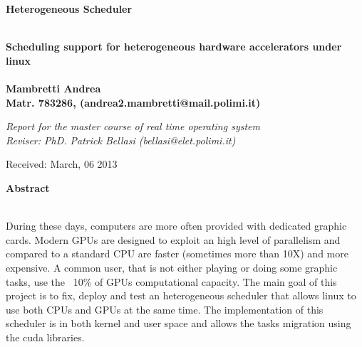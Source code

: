 \documentclass[a4paper,13pt]{article}
\newenvironment*{mytitle}{\begin{LARGE}\bf}{\end{LARGE}\\}%
\newenvironment*{mysubtitle}{\bf}{\\[1.5ex]}%
\newenvironment*{myabstract}{\begin{Large}\bf}{\end{Large}\\[2.5ex]}%
\begin{document}
\begin{mytitle}Heterogeneous Scheduler\end{mytitle}
\begin{mysubtitle}Scheduling support for heterogeneous hardware accelerators under linux\cite{tobias_thesis}\end{mysubtitle}
%
%
\\
Mambretti Andrea\\
Matr. 783286, (andrea2.mambretti@mail.polimi.it)\\
\begin{flushright}
\emph{Report for the master course of real time operating system}\\
\emph{Reviser: PhD. Patrick Bellasi (bellasi@elet.polimi.it)}
\end{flushright}

Received: March, 06 2013\\
\hspace{10ex}

\begin{myabstract} Abstract \end{myabstract}
During these days, computers are more often provided with dedicated graphic cards. Modern GPUs are
designed to exploit an high level of parallelism and compared to a standard CPU are faster
 (sometimes more than 10X) and more expensive. 
A common user, that is not either playing or doing some graphic tasks, use the ~10\% of GPUs 
computational capacity. The main goal of this project is to fix, deploy and test an heterogeneous 
scheduler that allows linux to use both CPUs and GPUs at the same time. The implementation of this 
scheduler is in both kernel and user space and allows the tasks migration using the cuda libraries.
\end{document}
